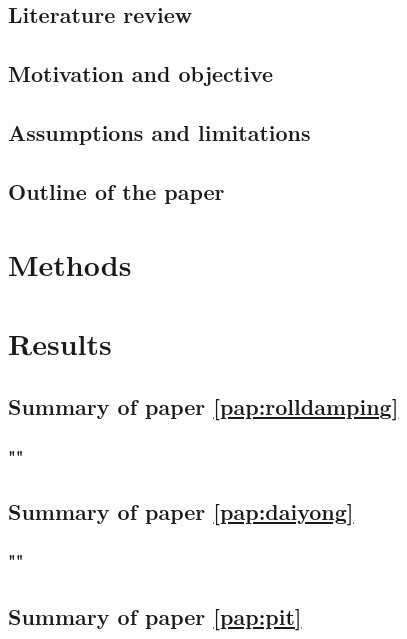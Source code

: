\section{Literature review}


\section{Motivation and objective}

\section{Assumptions and limitations}

\section{Outline of the paper}


\chapter{Methods\label{ch:methods}}

\chapter{Results\label{ch:results}}

\section{Summary of paper \ref{pap:rolldamping}}
\subsection*{""}

\section{Summary of paper \ref{pap:daiyong}}
\subsection*{""}

\section{Summary of paper \ref{pap:pit}}
